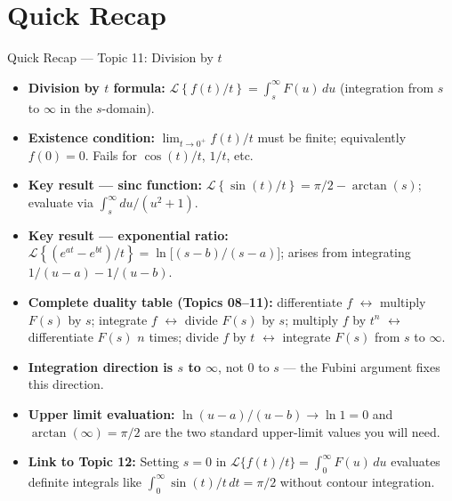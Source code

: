 \documentclass[12pt,a4paper]{article}
\begin{document}
\section{Quick Recap}

\begin{learnbox}{Quick Recap --- Topic 11: Division by $t$}
\begin{itemize}[leftmargin=1.5em]
  \item \textbf{Division by $t$ formula:}
        $\mathcal{L}\!\left\{f(t)/t\right\} = \int_s^\infty F(u)\,du$
        (integration from $s$ to $\infty$ in the $s$-domain).
  \item \textbf{Existence condition:}
        $\lim_{t\to 0^+}f(t)/t$ must be finite; equivalently $f(0)=0$.
        Fails for $\cos(t)/t$, $1/t$, etc.
  \item \textbf{Key result --- sinc function:}
        $\mathcal{L}\!\left\{\sin(t)/t\right\} = \pi/2 - \arctan(s)$;
        evaluate via $\int_s^\infty du/(u^2+1)$.
  \item \textbf{Key result --- exponential ratio:}
        $\mathcal{L}\!\left\{(e^{at}-e^{bt})/t\right\} = \ln\!\bigl[(s-b)/(s-a)\bigr]$;
        arises from integrating $1/(u-a)-1/(u-b)$.
  \item \textbf{Complete duality table (Topics 08--11):}
        differentiate $f$ $\leftrightarrow$ multiply $F(s)$ by $s$;
        integrate $f$ $\leftrightarrow$ divide $F(s)$ by $s$;
        multiply $f$ by $t^n$ $\leftrightarrow$ differentiate $F(s)$ $n$ times;
        divide $f$ by $t$ $\leftrightarrow$ integrate $F(s)$ from $s$ to $\infty$.
  \item \textbf{Integration direction is $s$ to $\infty$}, not $0$ to $s$ ---
        the Fubini argument fixes this direction.
  \item \textbf{Upper limit evaluation:} $\ln(u-a)/(u-b)\to\ln 1=0$ and
        $\arctan(\infty)=\pi/2$ are the two standard upper-limit values you
        will need.
  \item \textbf{Link to Topic 12:} Setting $s=0$ in
        $\mathcal{L}\{f(t)/t\}=\int_0^\infty F(u)\,du$ evaluates definite
        integrals like $\int_0^\infty \sin(t)/t\,dt = \pi/2$ without
        contour integration.
\end{itemize}
\end{learnbox}
\end{document}
